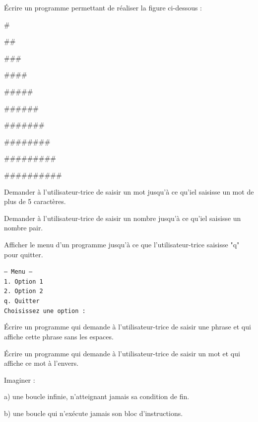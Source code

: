 \documentclass[11pt, a4paper]{book}
\begin{document}
\begin{exercice}
Écrire un programme permettant de réaliser la figure ci-dessous :

\#

\#\#

\#\#\#

\#\#\#\#

\#\#\#\#\#

\#\#\#\#\#\#

\#\#\#\#\#\#\#

\#\#\#\#\#\#\#\#

\#\#\#\#\#\#\#\#\#

\#\#\#\#\#\#\#\#\#\#
\end{exercice}


\begin{exercice}
Demander à l'utilisateur-trice de saisir un mot jusqu'à ce qu'iel saisisse un mot de plus de 5 caractères.
\end{exercice}

\begin{exercice}
Demander à l'utilisateur-trice de saisir un nombre jusqu'à ce qu'iel saisisse un nombre pair. 
\end{exercice}

\begin{exercice}
Afficher le menu d'un programme jusqu'à ce que l'utilisateur-trice saisisse "q" pour quitter.

\texttt{--- Menu --- \\
1. Option 1\\
2. Option 2\\
q. Quitter\\
Choisissez une option :}
\end{exercice}


\begin{exercice}
Écrire un programme qui demande à l'utilisateur-trice de saisir une phrase et qui affiche cette phrase sans les espaces.
\end{exercice}


\begin{exercice}
Écrire un programme qui demande à l'utilisateur-trice de saisir un mot et qui affiche ce mot à l'envers.
\end{exercice}



\begin{exercice}
Imaginer :
\item[a)] une boucle infinie, n'atteignant jamais sa condition de fin.
\item[b)] une boucle qui n'exécute jamais son bloc d'instructions.
\end{exercice}
\end{document}
